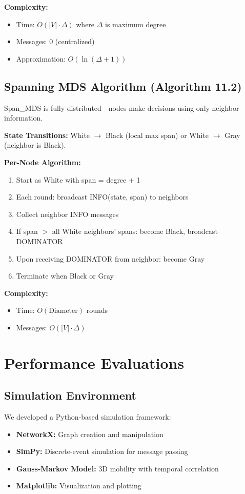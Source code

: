 \documentclass[conference]{IEEEtran}
\begin{document}
\textbf{Complexity:}
\begin{itemize}
    \item Time: $O(|V| \cdot \Delta)$ where $\Delta$ is maximum degree
    \item Messages: $0$ (centralized)
    \item Approximation: $O(\ln(\Delta + 1))$
\end{itemize}

\subsection{Spanning MDS Algorithm (Algorithm 11.2)}
Span\_MDS is fully distributed---nodes make decisions using only neighbor information.

\textbf{State Transitions:} White $\rightarrow$ Black (local max span) or White $\rightarrow$ Gray (neighbor is Black).

\textbf{Per-Node Algorithm:}
\begin{enumerate}
    \item Start as White with span = degree + 1
    \item Each round: broadcast INFO(state, span) to neighbors
    \item Collect neighbor INFO messages
    \item If span $>$ all White neighbors' spans: become Black, broadcast DOMINATOR
    \item Upon receiving DOMINATOR from neighbor: become Gray
    \item Terminate when Black or Gray
\end{enumerate}

\textbf{Complexity:}
\begin{itemize}
    \item Time: $O(\text{Diameter})$ rounds
    \item Messages: $O(|V| \cdot \Delta)$
\end{itemize}

\section{Performance Evaluations}

\subsection{Simulation Environment}
We developed a Python-based simulation framework:
\begin{itemize}
    \item \textbf{NetworkX:} Graph creation and manipulation
    \item \textbf{SimPy:} Discrete-event simulation for message passing
    \item \textbf{Gauss-Markov Model:} 3D mobility with temporal correlation
    \item \textbf{Matplotlib:} Visualization and plotting
\end{itemize}
\end{document}
